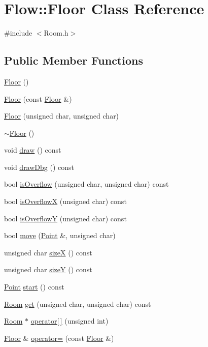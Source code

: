 \hypertarget{class_flow_1_1_floor}{}\section{Flow\+:\+:Floor Class Reference}
\label{class_flow_1_1_floor}


{\ttfamily \#include $<$Room.\+h$>$}

\subsection*{Public Member Functions}
\begin{DoxyCompactItemize}
\item 
\hyperlink{class_flow_1_1_floor_a056779b11b4084e15cc7c376f791a8f3}{Floor} ()
\item 
\hyperlink{class_flow_1_1_floor_ab4003203c3ad5de4c13d669bddbb0df5}{Floor} (const \hyperlink{class_flow_1_1_floor}{Floor} \&)
\item 
\hyperlink{class_flow_1_1_floor_afc7d87d65bc697a8901ad9506bafb5b9}{Floor} (unsigned char, unsigned char)
\item 
\hyperlink{class_flow_1_1_floor_abcb53e88835e043390289c0aac035ac0}{$\sim$\+Floor} ()
\item 
void \hyperlink{class_flow_1_1_floor_a8b0f7d881353b347f54c656189643b51}{draw} () const
\item 
void \hyperlink{class_flow_1_1_floor_a9cab7af772e3b3a12f289b0942e870f1}{draw\+Dbg} () const
\item 
bool \hyperlink{class_flow_1_1_floor_a649041679a73f38cf92ef7082c885795}{is\+Overflow} (unsigned char, unsigned char) const
\item 
bool \hyperlink{class_flow_1_1_floor_a6511d441ffd99d0a0d85669cfa846945}{is\+OverflowX} (unsigned char) const
\item 
bool \hyperlink{class_flow_1_1_floor_aae39e73db09b3b26d17dfda7418a67d1}{is\+OverflowY} (unsigned char) const
\item 
bool \hyperlink{class_flow_1_1_floor_a257b06bf103cca41a2b6e42692fb4fbe}{move} (\hyperlink{struct_flow_1_1_point}{Point} \&, unsigned char)
\item 
unsigned char \hyperlink{class_flow_1_1_floor_ad56ae970e75d1be616164efd2f84125b}{sizeX} () const
\item 
unsigned char \hyperlink{class_flow_1_1_floor_a6b25e8faedfd7de16efea8523c45794c}{sizeY} () const
\item 
\hyperlink{struct_flow_1_1_point}{Point} \hyperlink{class_flow_1_1_floor_aaac7f88dd55b4fe38ba36f686109fe7b}{start} () const
\item 
\hyperlink{class_flow_1_1_room}{Room} \hyperlink{class_flow_1_1_floor_a167e37ebab4947cdc191890647ff99e6}{get} (unsigned char, unsigned char) const
\item 
\hyperlink{class_flow_1_1_room}{Room} $\ast$ \hyperlink{class_flow_1_1_floor_a4b76afdb21d1687bd9ed0d37e09a15d7}{operator\mbox{[}$\,$\mbox{]}} (unsigned int)
\item 
\hyperlink{class_flow_1_1_floor}{Floor} \& \hyperlink{class_flow_1_1_floor_a0d053f735a848823fcb7e2f8650090da}{operator=} (const \hyperlink{class_flow_1_1_floor}{Floor} \&)
\end{DoxyCompactItemize}


